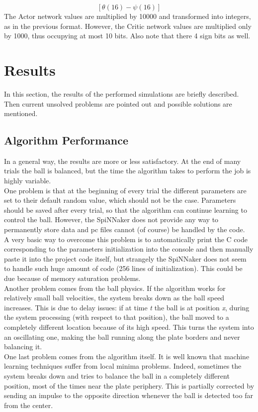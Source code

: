 \documentclass{article}
\begin{document}
\[
[\theta (16) - \psi (16)]
\]
The Actor network values are multiplied by 10000 and transformed into integers, as in the previous format. However, the Critic network values are multiplied only by 1000, thus occupying at most 10 bits. Also note that there 4 sign bits as well.


\section{Results}
In this section, the results of the performed simulations are briefly described. Then current unsolved problems are pointed out and possible solutions are mentioned.

\subsection{Algorithm Performance}
In a general way, the results are more or less satisfactory. At the end of many trials the ball is balanced, but the time the algorithm takes to perform the job is highly variable. \\
One problem is that at the beginning of every trial the different parameters are set to their default random value, which should not be the case. Parameters should be saved after every trial, so that the algorithm can continue learning to control the ball. However, the SpiNNaker does not provide any way to permanently store data and pc files cannot (of course) be handled by the code.\\
A very basic way to overcome this problem is to automatically print the C code corresponding to the parameters initialization into the console and then manually paste it into the project code itself, but strangely the SpiNNaker does not seem to handle such huge amount of code (256 lines of initialization). This could be due because of memory saturation problems.\\

Another problem comes from the ball physics. If the algorithm works for relatively small ball velocities, the system breaks down as the ball speed increases. This is due to delay issues: if at time \textit{t} the ball is at position \textit{x}, during the system processing (with respect to that position), the ball moved to a completely different location because of its high speed. This turns the system into an oscillating one, making the ball running along the plate borders and never balancing it.\\

One last problem comes from the algorithm itself. It is well known that machine learning techniques suffer from local minima problems. Indeed, sometimes the system breaks down and tries to balance the ball in a completely different position, most of the times near the plate periphery. This is partially corrected by sending an impulse to the opposite direction whenever the ball is detected too far from the center.\\
\end{document}
